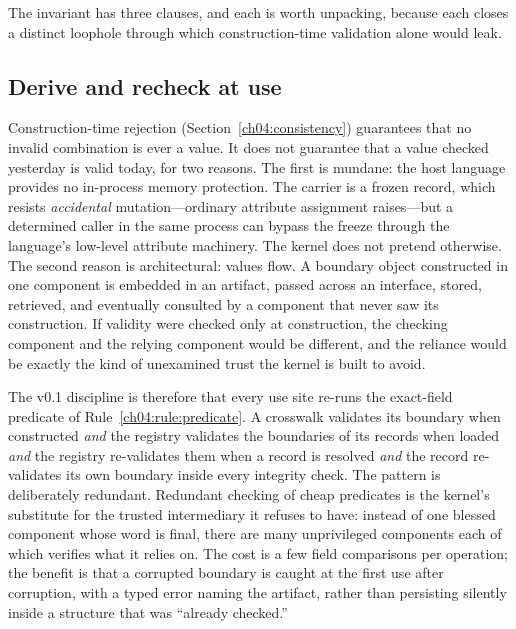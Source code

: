 The invariant has three clauses, and each is worth unpacking, because each
closes a distinct loophole through which construction-time validation alone
would leak.

\subsection{Derive and recheck at use}

Construction-time rejection (Section~\ref{ch04:consistency}) guarantees that
no invalid combination is ever a value. It does not guarantee that a value
checked yesterday is valid today, for two reasons. The first is mundane: the
host language provides no in-process memory protection. The carrier is a
frozen record, which resists \emph{accidental} mutation---ordinary attribute
assignment raises---but a determined caller in the same process can bypass
the freeze through the language's low-level attribute machinery. The kernel
does not pretend otherwise. The second reason is architectural: values flow.
A boundary object constructed in one component is embedded in an artifact,
passed across an interface, stored, retrieved, and eventually consulted by a
component that never saw its construction. If validity were checked only at
construction, the checking component and the relying component would be
different, and the reliance would be exactly the kind of unexamined trust
the kernel is built to avoid.

The v0.1 discipline is therefore that every use site re-runs the exact-field
predicate of Rule~\ref{ch04:rule:predicate}. A crosswalk validates its
boundary when constructed \emph{and} the registry validates the boundaries of
its records when loaded \emph{and} the registry re-validates them when a
record is resolved \emph{and} the record re-validates its own boundary inside
every integrity check. The pattern is deliberately redundant. Redundant
checking of cheap predicates is the kernel's substitute for the trusted
intermediary it refuses to have: instead of one blessed component whose
word is final, there are many unprivileged components each of which verifies
what it relies on. The cost is a few field comparisons per operation; the
benefit is that a corrupted boundary is caught at the first use after
corruption, with a typed error naming the artifact, rather than persisting
silently inside a structure that was ``already checked.''

